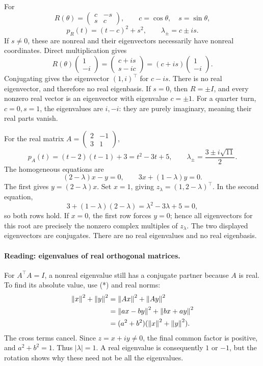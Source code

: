 \begin{example}
For
\[
 R(\theta)=\begin{pmatrix}c&-s\\s&c\end{pmatrix},
 \qquad c=\cos\theta,\quad s=\sin\theta,
\]
\[
 p_R(t)=(t-c)^2+s^2,\qquad \lambda_\pm=c\pm is.
\]
If \(s\ne0\), these are nonreal and their eigenvectors necessarily
have nonreal coordinates. Direct multiplication gives
\[
 R(\theta)\begin{pmatrix}1\\-i\end{pmatrix}
 =\begin{pmatrix}c+is\\s-ic\end{pmatrix}
 =(c+is)\begin{pmatrix}1\\-i\end{pmatrix}.
\]
Conjugating gives the eigenvector \((1,i)^\top\) for \(c-is\).
There is no real eigenvector, and therefore no real eigenbasis.
If \(s=0\), then \(R=\pm I\), and every nonzero real vector is an
eigenvector with eigenvalue \(c=\pm1\).
For a quarter turn, \(c=0,s=1\), the eigenvalues are \(i,-i\):
they are purely imaginary, meaning their real parts vanish.
\end{example}

\begin{example}
For the real matrix \(A=\begin{pmatrix}2&-1\\3&1\end{pmatrix}\),
\[
 p_A(t)=(t-2)(t-1)+3=t^2-3t+5,\qquad
 \lambda_\pm=\frac{3\pm i\sqrt{11}}2.
\]
The homogeneous equations are
\[
 (2-\lambda)x-y=0,\qquad 3x+(1-\lambda)y=0.
\]
The first gives \(y=(2-\lambda)x\). Set \(x=1\), giving
\(z_\lambda=(1,2-\lambda)^\top\). In the second equation,
\[
 3+(1-\lambda)(2-\lambda)=\lambda^2-3\lambda+5=0,
\]
so both rows hold. If \(x=0\), the first row forces \(y=0\);
hence all eigenvectors for this root are precisely the nonzero complex
multiples of \(z_\lambda\).
The two displayed eigenvectors are conjugates. There are no real
eigenvalues and no real eigenbasis.
\end{example}

\paragraph{Reading: eigenvalues of real orthogonal matrices.}
For \(A^\top A=I\), a nonreal eigenvalue still has a conjugate partner
because \(A\) is real. To find its absolute value, use (*) and real norms:
\[
 \begin{aligned}
 \left\lVert x\right\rVert^2+\left\lVert y\right\rVert^2
 &=\left\lVert Ax\right\rVert^2+\left\lVert Ay\right\rVert^2\\
 &=\left\lVert ax-by\right\rVert^2+\left\lVert bx+ay\right\rVert^2\\
 &=(a^2+b^2)(\left\lVert x\right\rVert^2+\left\lVert y\right\rVert^2).
 \end{aligned}
\]
The cross terms cancel. Since \(z=x+iy\ne0\), the final common factor
is positive, and \(a^2+b^2=1\). Thus \(|\lambda|=1\).
A real eigenvalue is consequently \(1\) or \(-1\), but the rotation
shows why these need not be all the eigenvalues.

